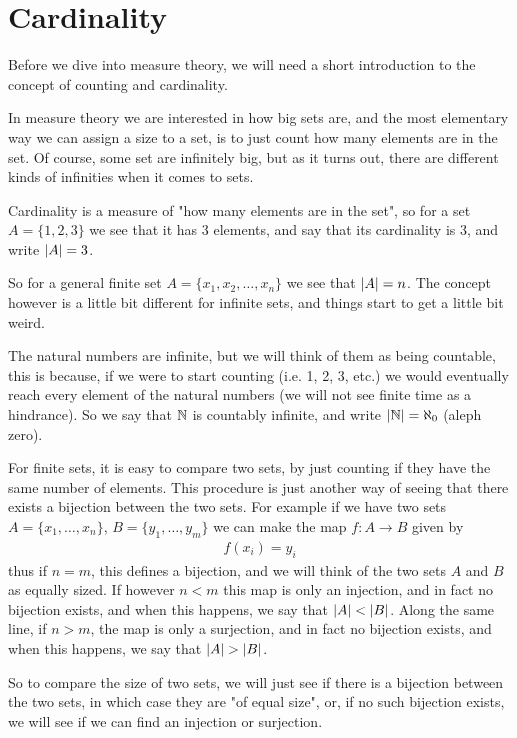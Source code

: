 \documentclass[../../textbook.tex]{subfiles}
\begin{document}
\section{Cardinality}

Before we dive into measure theory, we will need a short introduction to the concept of counting and cardinality. %

In measure theory we are interested in how big sets are, and the most elementary way we can assign a size to a set, is to just count how many elements are in the set. Of course, some set are infinitely big, but as it turns out, there are different kinds of infinities when it comes to sets.

Cardinality is a measure of "how many elements are in the set", so for a set $A=\{1,2,3\}$ we see that it has 3 elements, and say that its cardinality is 3, and write $\left|A\right|=3$.

So for a general finite set $A=\{x_1,x_2,\dots, x_n\}$ we see that $\left|A\right|=n$. The concept however is a little bit different for infinite sets, and things start to get a little bit weird.

The natural numbers are infinite, but we will think of them as being countable, this is because, if we were to start counting (i.e. 1, 2, 3, etc.) we would eventually reach every element of the natural numbers (we will not see finite time as a hindrance). So we say that $\mathbb{N}$ is countably infinite, and write $\left|\mathbb{N}\right|=\aleph_0$ (aleph zero).

For finite sets, it is easy to compare two sets, by just counting if they have the same number of elements. This procedure is just another way of seeing that there exists a bijection between the two sets. For example if we have two sets $A=\{x_1, \dots, x_n\}$, $B=\{y_1,\dots, y_m\}$ we can make the map $f:A \to B$ given by
\begin{align*}
    f(x_i)=y_i
\end{align*}
thus if $n=m$, this defines a bijection, and we will think of the two sets $A$ and $B$ as equally sized. If however $n<m$ this map is only an injection, and in fact no bijection exists, and when this happens, we say that $\left|A\right|<\left|B\right|$. Along the same line, if $n>m$, the map is only a surjection, and in fact no bijection exists, and when this happens, we say that $\card{A}>\card{B}$.

So to compare the size of two sets, we will just see if there is a bijection between the two sets, in which case they are "of equal size", or, if no such bijection exists, we will see if we can find an injection or surjection.
\end{document}
